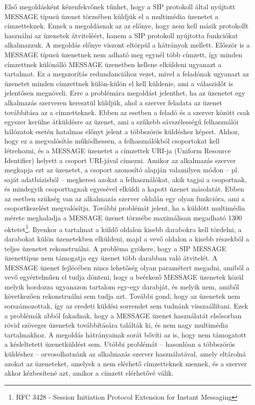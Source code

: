 Első megoldásként kézenfekvőnek tűnhet, hogy a SIP protokoll által nyújtott MESSAGE típusú üzenet törzsében küldjük el a multimédia üzenetet a címzetteknek. Ennek a megoldásnak az az előnye, hogy nem kell másik protokollt használni az üzenetek átviteléért, hanem a SIP protokoll nyújtotta funkciókat alkalmazzuk. A megoldás előnye viszont eltörpül a hátrányok mellett. Először is a MESSAGE típusú üzenetnek nem adható meg egynél több címzett, így minden címzettnek különálló MESSAGE üzenetben kellene elküldeni ugyanazt a tartalmat. Ez a megszorítás redundanciához vezet, mivel a feladónak ugyanazt az üzenetet minden címzettnek külön-külön el kell küldenie, ami a válaszidőt is jelentősen megnöveli. Erre a problémára megoldást jelenthet, ha az üzenetet egy alkalmazás szerveren keresztül küldjük, ahol a szerver feladata az üzenet továbbítása az a címzetteknek. Ebben az esetben a feladó és a szerver között csak egyszer kerülne átküldésre az üzenet, ami a szűkebb sávszélességű felhasználói hálózatok esetén hatalmas előnyt jelent a többszörös küldéshez képest. Ahhoz, hogy ez a megvalósítás működhessen, a felhasználókból csoportokat kell létrehozni, és a MESSAGE üzenetet a címzettek URI-ja (Uniform Resource Identifier) helyett a csoport URI-jával címezni. Amikor az alkalmazás szerver megkapja ezt az üzenetet, a csoport azonosító alapján valamilyen módon -- pl. saját adatbázisból -- megkeresi azokat a felhasználókat, akik tagjai a csoportnak, és mindegyik csoporttagnak egyesével elküldi a kapott üzenet másolatát. Ebben az esetben szükség van az alkalmazás szerver oldalán egy olyan funkcióra, ami a csoportkezelést megvalósítja.
További problémát jelent, ha a küldött multimédia mérete meghaladja a MESSAGE üzenet törzsébe maximálisan megadható 1300 oktetet\footnote{RFC 3428 - Session Initiation Protocol Extension for Instant Messaging}. Ilyenkor a tartalmat a küldő oldalon kisebb darabokra kell tördelni, a darabokat külön üzenetekben elküldeni, majd a vevő oldalon a kisebb részekből a teljes üzenetet rekonstruálni. A probléma gyökere, hogy a SIP MESSAGE üzenettípus nem támogatja egy üzenet több darabban való átvitelét. A MESSAGE üzenet fejlécében nincs lehetőség olyan paramétert megadni, amiből a vevő egyértelműen el tudja dönteni, hogy a beérkező MESSAGE üzenetek közül melyik hordozza ugyanazon tartalom egy-egy darabját, és melyik nem, amiből következően rekonstruálni sem tudja azt. További gond, hogy az üzenetek nem sorszámozottak, így az eredeti küldési sorrendet sem tudnánk visszaállítani. Ezek a problémák abból fakadnak, hogy a MESSAGE üzenet használatát elsősorban rövid szöveges üzenetek továbbítására találták ki, és nem nagy multimédia tartalmakhoz. 
A megoldás hátrányainak sorát bővíti az is, hogy nem támogatott a késleltetett üzenetküldést sem. Utóbbi problémát -- hasonlóan a többszörös küldéshez -- orvosolhatnánk az alkalmazás szerver használatával, amely eltárolná azokat az üzeneteket, amelyek a nem elérhető címzetteknek mennek, és a szerver akkor kézbesítené azt, amikor a címzett elérhetővé válik.


